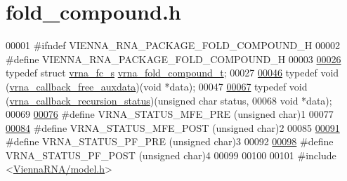 \hypertarget{fold__compound_8h_source}{}\section{fold\+\_\+compound.\+h}
\label{fold__compound_8h_source}

\begin{DoxyCode}
00001 \textcolor{preprocessor}{#ifndef VIENNA\_RNA\_PACKAGE\_FOLD\_COMPOUND\_H}
00002 \textcolor{preprocessor}{#define VIENNA\_RNA\_PACKAGE\_FOLD\_COMPOUND\_H}
00003 
\hyperlink{group__fold__compound_ga1b0cef17fd40466cef5968eaeeff6166}{00026} \textcolor{keyword}{typedef} \textcolor{keyword}{struct }\hyperlink{group__fold__compound_structvrna__fc__s}{vrna\_fc\_s} \hyperlink{group__fold__compound_structvrna__fc__s}{vrna\_fold\_compound\_t};
00027 
\hyperlink{group__fold__compound_ga7806651f51b195013839a218b3bbd5a3}{00046} \textcolor{keyword}{typedef} void (\hyperlink{group__fold__compound_ga7806651f51b195013839a218b3bbd5a3}{vrna\_callback\_free\_auxdata})(\textcolor{keywordtype}{void} *data);
00047 
\hyperlink{group__fold__compound_gac86036fa8cad1108832335063243cdc8}{00067} \textcolor{keyword}{typedef} void (\hyperlink{group__fold__compound_gac86036fa8cad1108832335063243cdc8}{vrna\_callback\_recursion\_status})(\textcolor{keywordtype}{unsigned} \textcolor{keywordtype}{char} status,
00068                                               \textcolor{keywordtype}{void}          *data);
00069 
\hyperlink{group__fold__compound_ga1a5053dc8acbb0111e852988726f07d6}{00076} \textcolor{preprocessor}{#define VRNA\_STATUS\_MFE\_PRE     (unsigned char)1}
00077 
\hyperlink{group__fold__compound_ga47c900ca76e56e59e2e83a06e0bde641}{00084} \textcolor{preprocessor}{#define VRNA\_STATUS\_MFE\_POST    (unsigned char)2}
00085 
\hyperlink{group__fold__compound_ga91795d35ebdb6f32be50459f24b3d114}{00091} \textcolor{preprocessor}{#define VRNA\_STATUS\_PF\_PRE      (unsigned char)3}
00092 
\hyperlink{group__fold__compound_ga1c6fa243533fd026e50f7d595eaaa565}{00098} \textcolor{preprocessor}{#define VRNA\_STATUS\_PF\_POST     (unsigned char)4}
00099 
00100 
00101 \textcolor{preprocessor}{#include <\hyperlink{model_8h}{ViennaRNA/model.h}>}

\end{DoxyCode}
